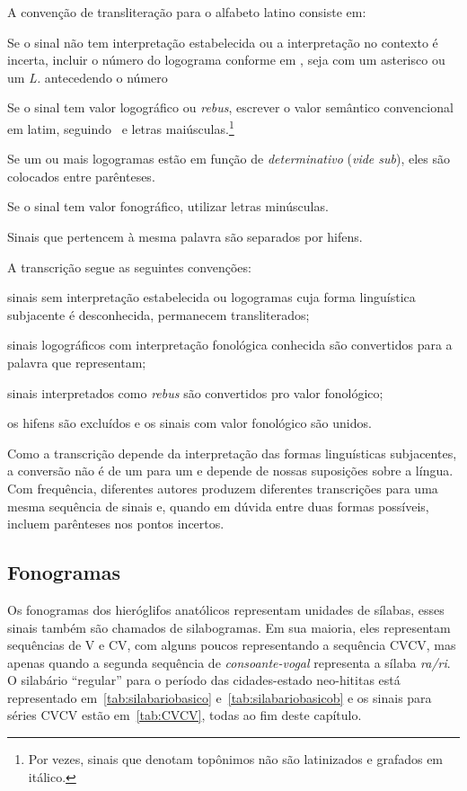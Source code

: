 \noindent A convenção de transliteração para o alfabeto latino consiste em:
\noprelistbreak%
\begin{compactenum}
	\item Se o sinal não tem interpretação estabelecida ou a interpretação no
	contexto é incerta, incluir o número do logograma conforme em
	\citet{LarocheHH}, seja com um asterisco ou um \emph{L.} antecedendo o
	número
	\item Se o sinal tem valor logográfico ou \emph{rebus},
	escrever o valor semântico convencional em latim,
	seguindo~\citet{LarocheHH} e letras maiúsculas.\footnote{Por vezes,
		sinais que denotam topônimos não são latinizados e grafados em itálico.}
	\item Se um ou mais logogramas estão em função de \emph{determinativo}
	(\emph{vide sub}), eles são colocados entre parênteses.
	\item Se o sinal tem valor fonográfico, utilizar letras minúsculas.
	\item Sinais que pertencem à mesma palavra são separados por hifens.
\end{compactenum}
A transcrição segue as seguintes convenções:
\begin{compactenum}
	\item sinais sem interpretação estabelecida ou logogramas cuja forma linguística
	subjacente é desconhecida, permanecem transliterados;
	\item sinais logográficos com interpretação fonológica conhecida são convertidos para a
	palavra que representam;
	\item sinais interpretados como \emph{rebus} são convertidos pro valor
	fonológico;
	\item os hifens são excluídos e os sinais com valor fonológico são unidos.
\end{compactenum}
Como a transcrição depende da interpretação das formas linguísticas subjacentes,
a conversão não é de um para um e depende de nossas suposições sobre a língua.
Com frequência, diferentes autores produzem diferentes transcrições para uma mesma
sequência de sinais e, quando em dúvida entre duas formas possíveis, incluem
parênteses nos pontos incertos.

\subsection{Fonogramas}

Os fonogramas dos hieróglifos anatólicos representam unidades de sílabas,
esses sinais também são chamados de silabogramas.
Em sua maioria, eles representam sequências de V e CV,
com alguns poucos representando a sequência CVCV, mas apenas quando a segunda
sequência de \emph{consoante\hyp{}vogal} representa a sílaba \emph{ra\slash{}ri}.\@
O silabário ``regular'' para o período das cidades-estado neo-hititas está
representado em~\autoref{tab:silabariobasico} e~\autoref{tab:silabariobasicob} e
os sinais para séries CVCV estão em~\autoref{tab:CVCV}, todas ao fim deste
capítulo.

